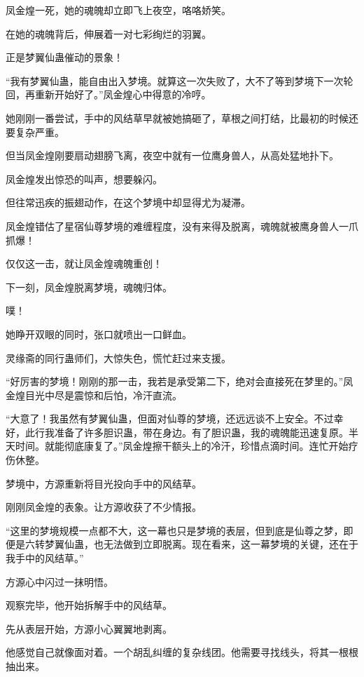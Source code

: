 
\begin{this_body}



凤金煌一死，她的魂魄却立即飞上夜空，咯咯娇笑。

在她的魂魄背后，伸展着一对七彩绚烂的羽翼。

正是梦翼仙蛊催动的景象！

“我有梦翼仙蛊，能自由出入梦境。就算这一次失败了，大不了等到梦境下一次轮回，再重新开始好了。”凤金煌心中得意的冷哼。

她刚刚一番尝试，手中的风结草早就被她搞砸了，草根之间打结，比最初的时候还要复杂严重。

但当凤金煌刚要扇动翅膀飞离，夜空中就有一位鹰身兽人，从高处猛地扑下。

凤金煌发出惊恐的叫声，想要躲闪。

但往常迅疾的振翅动作，在这个梦境中却显得尤为凝滞。

凤金煌错估了星宿仙尊梦境的难缠程度，没有来得及脱离，魂魄就被鹰身兽人一爪抓爆！

仅仅这一击，就让凤金煌魂魄重创！

下一刻，凤金煌脱离梦境，魂魄归体。

噗！

她睁开双眼的同时，张口就喷出一口鲜血。

灵缘斋的同行蛊师们，大惊失色，慌忙赶过来支援。

“好厉害的梦境！刚刚的那一击，我若是承受第二下，绝对会直接死在梦里的。”凤金煌目光中尽是震惊和后怕，冷汗直流。

“大意了！我虽然有梦翼仙蛊，但面对仙尊的梦境，还远远谈不上安全。不过幸好，此行我准备了许多胆识蛊，带在身边。有了胆识蛊，我的魂魄能迅速复原。半天时间。就能彻底康复了。”凤金煌擦干额头上的冷汗，珍惜点滴时间。连忙开始疗伤休整。

梦境中，方源重新将目光投向手中的风结草。

刚刚凤金煌的表象。让方源收获了不少情报。

“这里的梦境规模一点都不大，这一幕也只是梦境的表层，但到底是仙尊之梦，即便是六转梦翼仙蛊，也无法做到立即脱离。现在看来，这一幕梦境的关键，还在于我手中的风结草。”

方源心中闪过一抹明悟。

观察完毕，他开始拆解手中的风结草。

先从表层开始，方源小心翼翼地剥离。

他感觉自己就像面对着。一个胡乱纠缠的复杂线团。他需要寻找线头，将其一根根抽出来。


\end{this_body}
